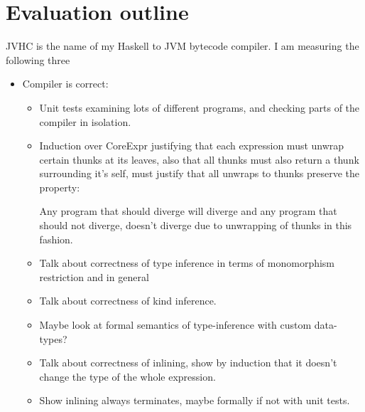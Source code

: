 \documentclass[a4paper]{article}
\begin{document}
\section*{Evaluation outline}
JVHC is the name of my Haskell to JVM bytecode compiler.
I am measuring the following three 
\begin{itemize}
  \item Compiler is correct: 
    \begin{itemize}
      \item Unit tests examining lots of different programs, and checking
        parts of the compiler in isolation.
      \item Induction over CoreExpr justifying that each expression
        must unwrap certain thunks at its leaves, also that  all thunks must
        also return a thunk surrounding
        it's self, must justify that all unwraps to thunks preserve the property:
        \begin{displayquote}
          Any program that should diverge will diverge and 
          any program that should not diverge, doesn't diverge due 
          to unwrapping of thunks in this fashion.
        \end{displayquote}
        
      \item Talk about correctness of type inference in terms of  monomorphism
        restriction and in general
      \item Talk about correctness of kind inference.

      \item Maybe look at formal semantics of type-inference
          with custom data-types?

      \item Talk about correctness of inlining, show by induction that
        it doesn't change the type of the whole expression.

      \item Show inlining always terminates, maybe formally if not 
        with unit tests.
    \end{itemize}


\end{itemize}
\end{document}
